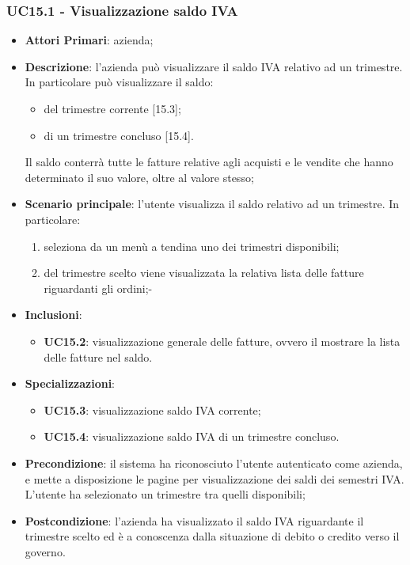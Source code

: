 \subsubsection{UC15.1 - Visualizzazione saldo IVA}
\begin{itemize}
	\item \textbf{Attori Primari}: azienda;
	\item \textbf{Descrizione}: l'azienda può visualizzare il saldo IVA relativo ad un trimestre. In particolare può visualizzare il saldo:
	\begin{itemize}
		\item del trimestre corrente [15.3];
		\item di un trimestre concluso [15.4].
	\end{itemize}
	Il saldo conterrà tutte le fatture relative agli acquisti e le vendite che hanno determinato il suo valore, oltre al valore stesso;
	\item \textbf{Scenario principale}: l'utente visualizza il saldo relativo ad un trimestre. In particolare:
	\begin{enumerate}[label=\alph*.]
		\item seleziona da un menù a tendina uno dei trimestri disponibili;
		\item del trimestre scelto viene visualizzata la relativa lista delle fatture riguardanti gli ordini;-
	\end{enumerate}
	\item \textbf{Inclusioni}: 
	\begin{itemize}
		\item \textbf{UC15.2}: visualizzazione generale delle fatture, ovvero il mostrare la lista delle fatture nel saldo.
	\end{itemize}
	\item \textbf{Specializzazioni}: 
	\begin{itemize}
		\item \textbf{UC15.3}: visualizzazione saldo IVA corrente;
		\item \textbf{UC15.4}:  visualizzazione saldo IVA di un trimestre concluso.
	\end{itemize}
	\item \textbf{Precondizione}: il sistema ha riconosciuto l'utente autenticato come azienda, e mette a disposizione le pagine per visualizzazione dei saldi dei semestri IVA. L'utente ha selezionato un trimestre tra quelli disponibili;
	\item \textbf{Postcondizione}: l'azienda ha visualizzato il saldo IVA riguardante il trimestre scelto ed è a conoscenza dalla situazione di debito o credito verso il governo.
\end{itemize} 
